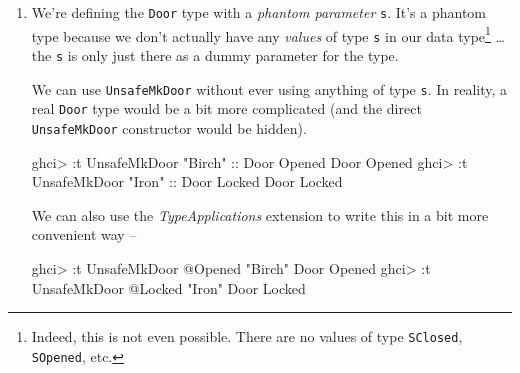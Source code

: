 \documentclass[]{article}
\newenvironment{Shaded}{}{}
\newcommand{\DataTypeTok}[1]{\textcolor[rgb]{0.56,0.13,0.00}{#1}}
\newcommand{\NormalTok}[1]{#1}
\newcommand{\OperatorTok}[1]{\textcolor[rgb]{0.40,0.40,0.40}{#1}}
\newcommand{\OtherTok}[1]{\textcolor[rgb]{0.00,0.44,0.13}{#1}}
\newcommand{\StringTok}[1]{\textcolor[rgb]{0.25,0.44,0.63}{#1}}
\begin{document}
\begin{enumerate}
\def\labelenumi{\arabic{enumi}.}
\setcounter{enumi}{2}
\item
  We're defining the \texttt{Door} type with a \emph{phantom parameter}
  \texttt{s}. It's a phantom type because we don't actually have any
  \emph{values} of type \texttt{s} in our data type\footnote{Indeed, this is not
    even possible. There are no values of type
    \texttt{\textquotesingle{}SClosed}, \texttt{\textquotesingle{}SOpened}, etc.}
  \ldots the \texttt{s} is only just there as a dummy parameter for the type.

  We can use \texttt{UnsafeMkDoor} without ever using anything of type
  \texttt{s}. In reality, a real \texttt{Door} type would be a bit more
  complicated (and the direct \texttt{UnsafeMkDoor} constructor would be
  hidden).

\begin{Shaded}
\begin{Highlighting}[]
\NormalTok{ghci}\OperatorTok{\textgreater{}} \OperatorTok{:}\NormalTok{t }\DataTypeTok{UnsafeMkDoor} \StringTok{"Birch"}\OtherTok{ ::} \DataTypeTok{Door} \DataTypeTok{\textquotesingle{}Opened}
\DataTypeTok{Door} \DataTypeTok{\textquotesingle{}Opened}
\NormalTok{ghci}\OperatorTok{\textgreater{}} \OperatorTok{:}\NormalTok{t }\DataTypeTok{UnsafeMkDoor} \StringTok{"Iron"}\OtherTok{ ::} \DataTypeTok{Door} \DataTypeTok{\textquotesingle{}Locked}
\DataTypeTok{Door} \DataTypeTok{\textquotesingle{}Locked}
\end{Highlighting}
\end{Shaded}

  We can also use the \emph{TypeApplications} extension to write this in a bit
  more convenient way --

\begin{Shaded}
\begin{Highlighting}[]
\NormalTok{ghci}\OperatorTok{\textgreater{}} \OperatorTok{:}\NormalTok{t }\DataTypeTok{UnsafeMkDoor} \OperatorTok{@}\DataTypeTok{\textquotesingle{}Opened} \StringTok{"Birch"}
\DataTypeTok{Door} \DataTypeTok{\textquotesingle{}Opened}
\NormalTok{ghci}\OperatorTok{\textgreater{}} \OperatorTok{:}\NormalTok{t }\DataTypeTok{UnsafeMkDoor} \OperatorTok{@}\DataTypeTok{\textquotesingle{}Locked} \StringTok{"Iron"}
\DataTypeTok{Door} \DataTypeTok{\textquotesingle{}Locked}
\end{Highlighting}
\end{Shaded}
\end{enumerate}
\end{document}
